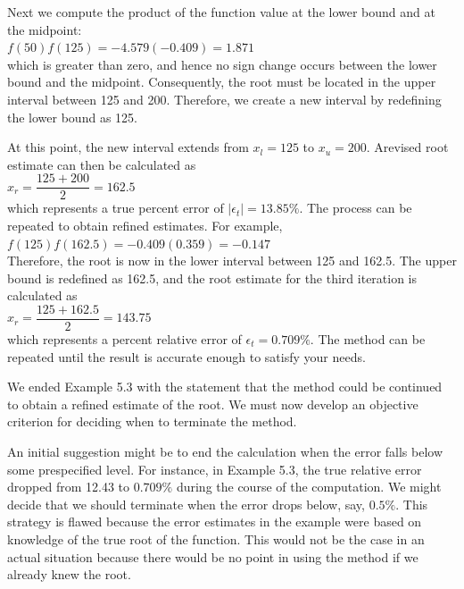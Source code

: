 \documentclass[../main.tex]{subfiles}
\begin{document}
\begin{example}
    \noindent Next we compute the product of the function value at the lower bound and at the midpoint:\\

    $f(50)f(125) = -4.579(-0.409)=1.871$\\

    \noindent which is greater than zero, and hence no sign change occurs between the lower bound and
    the midpoint. Consequently, the root must be located in the upper interval between 125 and
    200. Therefore, we create a new interval by redefining the lower bound as 125.

    At this point, the new interval extends from $x_l = 125$ to $x_u = 200$. Arevised root estimate
    can then be calculated as\\

    $x_r = \dfrac{125+200}{2}=162.5$\\

    \noindent which represents a true percent error of $\left\lvert \epsilon_t \right\rvert = 13.85\%$. The process can be repeated to obtain
    refined estimates. For example,\\

    $f(125)f(162.5) = -0.409(0.359)=-0.147$\\

    \noindent Therefore, the root is now in the lower interval between 125 and 162.5. The upper bound
    is redefined as 162.5, and the root estimate for the third iteration is calculated as\\

    $x_r = \dfrac{125+162.5}{2} = 143.75$\\

    \noindent which represents a percent relative error of $\epsilon_t = 0.709\%$. The method can be repeated until
    the result is accurate enough to satisfy your needs.\\
\end{example}

We ended Example 5.3 with the statement that the method could be continued to obtain
a refined estimate of the root. We must now develop an objective criterion for deciding when
to terminate the method.

An initial suggestion might be to end the calculation when the error falls below some
prespecified level. For instance, in Example 5.3, the true relative error dropped from 12.43
to $0.709\%$ during the course of the computation. We might decide that we should terminate
when the error drops below, say, $0.5\%$. This strategy is flawed because the error estimates
in the example were based on knowledge of the true root of the function. This would not be
the case in an actual situation because there would be no point in using the method if we
already knew the root.
\end{document}

